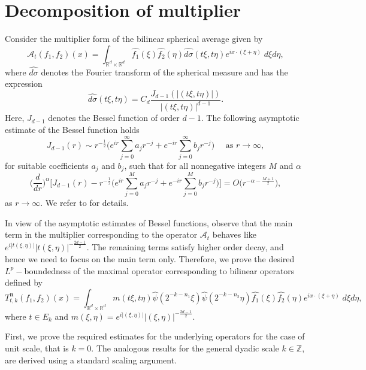 \documentclass[a4paper,reqno]{amsart}
\newcounter{old}
\numberwithin{equation}{section}
\newcommand{\R}{{\mathbb {R}}}
\newcommand{\Z}{{\mathbb Z}}
\begin{document}
	
	\section{Decomposition of multiplier}\label{multiplier}	
	Consider the multiplier form of the bilinear spherical average given by
	\[\mathcal{A}_t(f_1,f_2)(x)=\int_{\R^d\times\R^d}\widehat{f_1}(\xi)\widehat{f_2}(\eta)\widehat{d\sigma}(t\xi,t\eta)e^{ix\cdot(\xi+\eta)}\;d\xi d\eta,\]
	where $\widehat{d\sigma}$ denotes the Fourier transform of the spherical measure and has the expression
	\begin{equation}\label{measure}
		\widehat{d\sigma}(t\xi,t\eta)=C_d\frac{J_{d-1}(|(t\xi,t\eta)|)}{|(t\xi,t\eta)|^{d-1}}.
	\end{equation}
	Here, $J_{d-1}$ denotes the Bessel function of order $d-1$. The following asymptotic estimate of the Bessel function holds 
	\[J_{d-1}(r)\sim r^{-\frac{1}{2}}\bigg(e^{ir}\sum_{j=0}^\infty a_jr^{-j}+e^{-ir}\sum_{j=0}^\infty b_jr^{-j}\bigg)\quad \text{ as }r\to\infty,\]
	for suitable coefficients $a_j$ and $b_j$, such that for all nonnegative integers $M$ and $\alpha$
	\begin{equation}\label{asymptotics}
		\bigg(\frac{d}{dr}\bigg)^\alpha \Bigg[J_{d-1}(r)-r^{-\frac{1}{2}}\bigg(e^{ir}\sum_{j=0}^M a_jr^{-j}+e^{-ir}\sum_{j=0}^M b_jr^{-j}\bigg)\Bigg]=O\big(r^{-\alpha-\frac{M+1}{2}}\big),
	\end{equation}
	as $r\to\infty$. We refer to \cite[pp.~338 and Proposition 3 on pp. 334]{book-Stein} for details.
	
	In view of the asymptotic estimates of Bessel functions, observe that the main term in the multiplier corresponding to the operator $\mathcal A_t$ behaves like $e^{i |t(\xi,\eta)|}|t(\xi,\eta)|^{-\frac{2d-1}{2}}$. The remaining terms satisfy higher order decay, and hence we need to focus on the main term only. 
	Therefore, we prove the desired $L^p-$boundedness of the maximal operator corresponding to bilinear operators defined by 
	\[T^{\mathbf{n}}_{t,k}(f_1,f_2)(x)=\int_{\R^d\times\R^d}m(t\xi,t\eta)\widehat{\psi}\left(2^{-k-n_1} \xi\right)\widehat{\psi}\left(2^{-k-n_2} \eta\right)\widehat{f_1}(\xi)\widehat{f_2}(\eta)e^{ix\cdot(\xi+\eta)}\;d\xi d\eta,\]
	where $t\in E_k$ and $m(\xi,\eta)=e^{i|(\xi,\eta)|}|(\xi,\eta)|^{-\frac{2d-1}{2}}$. 
	
	First, we prove the required estimates for the underlying operators for the case of unit scale, that is $k=0$. The analogous results for the general dyadic scale $k\in\Z$, are derived using a standard scaling argument.
	
\end{document}
